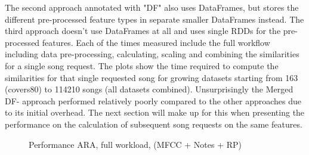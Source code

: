 \noindent The second approach annotated with "DF" also uses DataFrames, but stores the different pre-processed feature types in separate smaller DataFrames instead. The third approach doesn't use DataFrames at all and uses single RDDs for the pre-processed features. Each of the times measured include the full workflow including data pre-processing, calculating, scaling and combining the similarities for a single song request. The plots show the time required to compute the similarities for that single requested song for growing datasets starting from 163 (covers80) to 114210 songs (all datasets combined). 
\noindent Unsurprisingly the Merged DF- approach performed relatively poorly compared to the other approaches due to its initial overhead. The next section will make up for this when presenting the performance on the calculation of subsequent song requests on the same features.

\FloatBarrier
\begin{figure}[htbp]
	\centering
	\caption{Performance ARA, full workload, (MFCC + Notes + RP)}
	\label{perfspark2}
\end{figure}
\FloatBarrier

